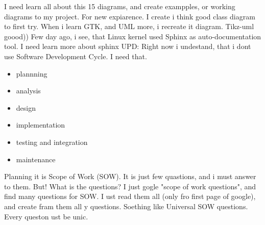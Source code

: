 \documentclass{article}
\begin{document}
I need learn all about this 15 diagrams, and create exampples, or working diagrams to my project. For new expiarence.
I create i think good class diagram to first try. When i learn GTK, and UML more, i recreate it diagram. Tikz-uml goood))
Few day ago, i see, that Linux kernel used Sphinx as auto-documentation tool. I need learn more about sphinx
UPD: Right now i undestand, that i dont use Software Development Cycle. I need that.
\begin{itemize}
  \item plannning
  \item analysis
  \item design
  \item implementation
  \item testing and integration
  \item maintenance
\end{itemize}
Planning it is Scope of Work (SOW). It is just few quastions, and i must answer to them. But! What is the questions? I just gogle "scope of work questions", and find many questions for SOW. I ust read them all (only fro first page of google), and create fram them all y questions. Soething like Universal SOW questions. Every queston ust be unic.
\end{document}
